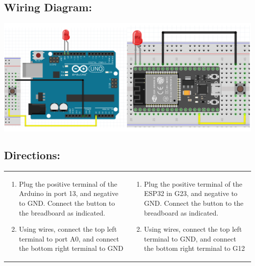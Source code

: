 \documentclass[a4paper,12pt]{report}
\newcommand{\diagramWidth}{150mm}
\begin{document}
\subsection*{Wiring Diagram:}
    \begin{center}
        \includegraphics[width = \diagramWidth]{Assets/button_led.png}
    \end{center}

\subsection*{Directions:}
\begin{center}
    \begin{tabularx}{\textwidth} { 
        | >{\raggedright\arraybackslash}X 
        | >{\raggedright\arraybackslash}X | }
        \hline
        \multicolumn{1}{|c|}{\textbf{Arduino}} & 
        \multicolumn{1}{|c|}{\textbf{ESP32}} \\
        \hline
        \begin{enumerate}
            \item Plug the positive terminal of the Arduino in port 13, and negative to GND. Connect the button to the breadboard as indicated.
            \item Using wires, connect the top left terminal to port A0, and connect the bottom right terminal to GND
        \end{enumerate} &
        \begin{enumerate}
            \item Plug the positive terminal of the ESP32 in G23, and negative to GND. Connect the button to the breadboard as indicated.
            \item Using wires, connect the top left terminal to GND, and connect the bottom right terminal to G12
        \end{enumerate} \\
        \hline
    \end{tabularx}
\end{center}
\end{document}
